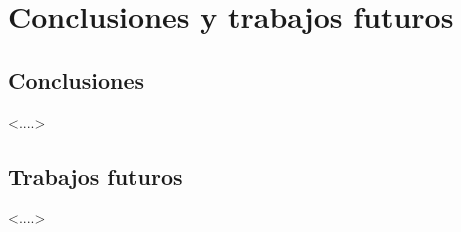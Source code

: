 
\chapter{Conclusiones y trabajos futuros}


\section{Conclusiones}

<....>

\section{Trabajos futuros}

<....>

